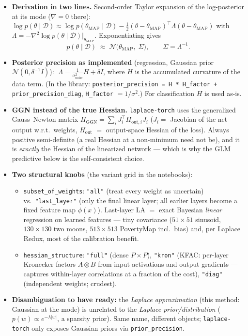 \documentclass[10pt,a4paper]{article}
\newcommand{\code}[1]{\texttt{#1}}
\newcommand{\map}{\mathrm{MAP}}
\begin{document}
\begin{itemize}
\item \textbf{Derivation in two lines.} Second-order Taylor expansion of the log-posterior at its
  mode ($\nabla=0$ there):
  $\log p(\theta\mid\mathcal{D}) \approx \log p(\theta_\map\mid\mathcal{D})
  -\tfrac12(\theta-\theta_\map)^\top \Lambda (\theta-\theta_\map)$
  with $\Lambda=-\nabla^2\log p(\theta\mid\mathcal{D})\big|_{\theta_\map}$. Exponentiating gives
  \[
  p(\theta\mid\mathcal{D})\;\approx\;\mathcal{N}\bigl(\theta_\map,\;\Sigma\bigr),\qquad
  \Sigma=\Lambda^{-1}.
  \]
\item \textbf{Posterior precision as implemented} (regression, Gaussian prior
  $\mathcal{N}(0,\delta^{-1}I)$):
  $\;\Lambda = \frac{1}{\sigma_{\text{noise}}^2}H + \delta I$, where $H$ is the accumulated
  curvature of the data term. (In the library: \code{posterior\_precision = H * H\_factor +
  prior\_precision\_diag}, \code{H\_factor} $=1/\sigma^2$.) For classification $H$ is used as-is.
\item \textbf{GGN instead of the true Hessian.} \code{laplace-torch} uses the generalized
  Gauss--Newton matrix $H_{\text{GGN}}=\sum_i J_i^\top H_{\text{out},i} J_i$
  ($J_i=$ Jacobian of the net output w.r.t.\ weights, $H_{\text{out}}$ $=$ output-space Hessian of
  the loss). Always positive semi-definite (a real Hessian at a non-minimum need not be), and it is
  \emph{exactly} the Hessian of the linearized network --- which is why the GLM predictive below is
  the self-consistent choice.
\item \textbf{Two structural knobs} (the variant grid in the notebooks):
  \begin{itemize}
  \item \code{subset\_of\_weights}: \code{"all"} (treat every weight as uncertain) vs.\
    \code{"last\_layer"} (only the final linear layer; all earlier layers become a fixed feature
    map $\phi(x)$). Last-layer LA $=$ exact Bayesian \emph{linear} regression on learned features
    --- tiny covariance ($51\times51$ sinusoid, $130\times130$ two moons, $513\times513$
    PovertyMap incl.\ bias) and, per Laplace Redux, most of the calibration benefit.
  \item \code{hessian\_structure}: \code{"full"} (dense $P\times P$), \code{"kron"} (KFAC:
    per-layer Kronecker factors $A\otimes B$ from input activations and output gradients ---
    captures within-layer correlations at a fraction of the cost), \code{"diag"} (independent
    weights; crudest).
  \end{itemize}
\item \textbf{Disambiguation to have ready:} the \emph{Laplace approximation} (this method:
  Gaussian at the mode) is unrelated to the \emph{Laplace prior/distribution}
  ($p(w)\propto e^{-\lambda|w|}$, a sparsity prior). Same name, different objects;
  \code{laplace-torch} only exposes Gaussian priors via \code{prior\_precision}.
\end{itemize}
\end{document}
